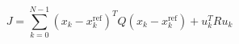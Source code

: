 \documentclass[a4paper]{article}
\title{}
\date{}
\begin{document}
    \maketitle
    \[
        J = \sum_{k=0}^{N-1}
        \left( x_k - x_k^{\mathrm{ref}} \right)^T
        Q
        \left( x_k - x_k^{\mathrm{ref}} \right)
        +
        u_k^T R u_k
    \]
    
\end{document}
